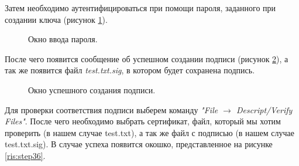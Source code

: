 \documentclass[10pt,a4paper]{report}
\begin{document}
Затем необходимо аутентифицироваться при помощи пароля, заданного при создании ключа (рисунок \ref{ris:step34}).

\begin{figure}[h]
	\caption{Окно ввода пароля.}
	\label{ris:step34}
\end{figure}

После чего появится сообщение об успешном создании подписи (рисунок \ref{ris:step35}), а так же появится файл \textit{test.txt.sig}, в котором будет сохранена подпись.

\begin{figure}[h]
	\caption{Окно успешного создания подписи.}
	\label{ris:step35}
\end{figure}

Для проверки соответствия подписи выберем команду \textit{"File \begin{math}\to\end{math} Descript/Verify Files"}. После чего необходимо выбрать сертификат, файл, который мы хотим проверить (в нашем случае test.txt), а так же файл с подписью (в нашем случае test.txt.sig). В случае успеха появится окошко, представленное на рисунке \ref{ris:step36}.
\end{document}
